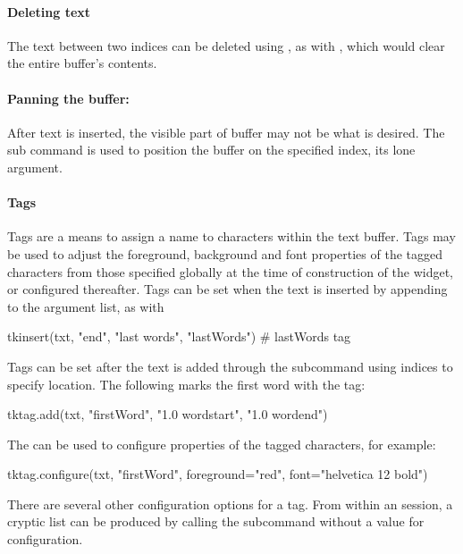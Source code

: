 \paragraph{Deleting text}

The text between two indices can be deleted using , as
with , which would clear the entire
buffer's contents.

\paragraph{Panning the buffer: }
After text is inserted, the visible part of buffer may not be what is
desired. The  sub command is used to position
the buffer on the specified index, its lone argument.


\paragraph{Tags}
Tags are a means to assign a name to characters within the text
buffer. Tags may be used to adjust the foreground, background and font
properties of the tagged characters from those specified globally at
the time of construction of the widget, or configured thereafter. Tags
can be set when the text is inserted by appending to the argument
list, as with
\begin{Schunk}
\begin{Sinput}
 tkinsert(txt, "end", "last words", "lastWords") # lastWords tag
\end{Sinput}
\end{Schunk}

Tags can be set after the text is added through the
 subcommand using indices to specify
location. The following marks the first word with the 
tag:
\begin{Schunk}
\begin{Sinput}
 tktag.add(txt, "firstWord", "1.0 wordstart", "1.0 wordend")
\end{Sinput}
\end{Schunk}
The  can be used to configure properties of the tagged characters, for example:
\begin{Schunk}
\begin{Sinput}
 tktag.configure(txt, "firstWord", foreground="red", 
                 font="helvetica 12 bold")
\end{Sinput}
\end{Schunk}
%
There are several other configuration options for a tag. From within
an \R\/ session, a cryptic list can be produced by calling the
subcommand  without a value for
configuration.


